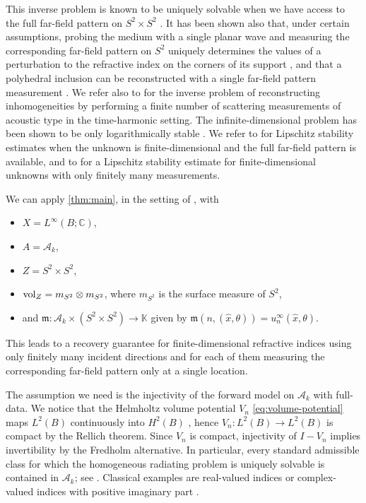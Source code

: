 \documentclass[11pt,oneside]{amsart}
\theoremstyle{plain}
\theoremstyle{definition}
\theoremstyle{remark}
\begin{document}
This inverse problem is known to be uniquely solvable when we have access to the full far-field pattern on $S^2\times S^2$ \cite{novikov1988multidimensional, nachman1988reconstructions,ramm1988recovery,colton1998inverse,kirsch2011introduction}. It has been shown also that, under certain assumptions, probing the medium with a single planar wave and measuring the corresponding far-field pattern on $S^2$ uniquely determines the values of a perturbation to the refractive
index on the corners of its support \cite{blaasten2020recovering}, and that a polyhedral inclusion can be reconstructed with a single far-field pattern measurement \cite{blaasten2021corners}. We refer also to \cite{di2026discretization} for the inverse problem of reconstructing inhomogeneities by performing a finite number of scattering measurements of acoustic type in the time-harmonic setting. The infinite-dimensional problem has been shown to be only logarithmically stable \cite{stefanov1990stability}. We refer to \cite{bourgeois2013remark} for Lipschitz stability estimates when the unknown is finite-dimensional and the full far-field pattern is available, and to \cite{alberti2022infinite} for a Lipschitz stability estimate for finite-dimensional unknowns with only finitely many measurements. 

We can apply  \cref{thm:main}, in the setting of , with
\begin{itemize}
    \item $X=L^\infty(B;\mathbb{C})$,
    \item $A=\mathcal A_k$,
    \item $Z=S^2\times S^2$,
    \item ${\rm vol}_Z=m_{S^2}\otimes m_{S^2}$, where $m_{S^2}$ is the surface measure of $S^2$,
    \item and $\mathfrak m\colon \mathcal{A}_k\times (S^2\times S^2)\to \mathbb K$ given by $\mathfrak m(n,(\widehat x,\theta))=u^\infty_n(\widehat x,\theta)$.
\end{itemize}
This leads to a recovery guarantee for finite-dimensional refractive indices using only finitely many incident directions and for each of them measuring the corresponding far-field pattern only at a single location. 

The assumption we need is the injectivity of the forward model on $\mathcal A_k$ with full-data. We notice that the Helmholtz volume potential $V_n$ \eqref{eq:volume-potential} maps $L^2(B)$ continuously into $H^2(B)$ \cite[Theorem 8.2]{colton1998inverse}, hence $V_n\colon L^2(B)\to L^2(B)$ is compact by the Rellich theorem. Since $V_n$ is compact, injectivity of $I-V_n$ implies invertibility by the Fredholm alternative. In particular, every standard admissible class for which the homogeneous radiating problem is uniquely solvable is contained in $\mathcal A_k$; see \cite{colton1998inverse,kirsch2011introduction}. Classical examples are real-valued indices \cite{ramm1988recovery, novikov1988multidimensional} or complex-valued indices with positive imaginary part \cite{bourgeois2013remark}.
\end{document}
